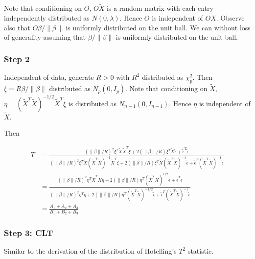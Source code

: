 \documentclass[review]{elsarticle}
\theoremstyle{plain}
\theoremstyle{definition}
\theoremstyle{remark}
\begin{document}
Note that conditioning on $O$, $O\tilde{X}$ is a random matrix with each entry independently distributed as $N(0,\lambda)$. Hence $O$ is independent of $O\tilde{X}$. Observe also that $O\beta/\|\beta\|$ is uniformly distributed on the unit ball.  We can without loss of generality assuming that $\beta/\|\beta\|$ is uniformly distributed on the unit ball.

\subsubsection{Step 2}
Independent of data, generate $R>0$ with $R^2$ distributed as $\chi^2_{p}$. Then $\xi=R\beta/\|\beta\|$ distributed as $N_p(0,I_p)$.
Note that conditioning on $\tilde{X}$, $\eta={(\tilde{X}^T\tilde{X})}^{-1/2}\tilde{X}^T \xi$ is distributed as $N_{n-1}(0,I_{n-1})$. Hence $\eta$ is independent of $\tilde{X}$.

Then

\begin{equation}
    \begin{aligned}
        T&=\frac{{(\|\beta\|/R)}^2\xi^T \tilde{X}\tilde{X}^T \xi+
        2(\|\beta\|/R)\xi^T \tilde{X}\tilde{\epsilon}+
        \tilde{\epsilon}^T\tilde{\epsilon}
    }{{(\|\beta\|/R)}^2\xi^T \tilde{X}{(\tilde{X}^T\tilde{X})}^{-1}\tilde{X}^T \xi+
        2(\|\beta\|/R)\xi^T \tilde{X}{(\tilde{X}^T\tilde{X})}^{-1}\tilde{\epsilon}+
        \tilde{\epsilon}^T{(\tilde{X}^T\tilde{X})}^{-1}\tilde{\epsilon}
    }\\
        &=
        \frac{{(\|\beta\|/R)}^2\eta^T \tilde{X}^T\tilde{X} \eta+
        2(\|\beta\|/R)\eta^T {(\tilde{X}^T\tilde{X})}^{1/2}\tilde{\epsilon}+
        \tilde{\epsilon}^T\tilde{\epsilon}
    }{{(\|\beta\|/R)}^2\eta^T\eta+
        2(\|\beta\|/R)\eta^T{(\tilde{X}^T\tilde{X})}^{-1/2}\tilde{\epsilon}+
        \tilde{\epsilon}^T{(\tilde{X}^T\tilde{X})}^{-1}\tilde{\epsilon}
    }\\
        &=\frac{A_1+A_2+A_3}{B_1+B_2+B_3}
    \end{aligned}
\end{equation}


\subsubsection{Step 3: CLT}
Similar to the derivation of the distribution of Hotelling's $T^2$ statistic.
\end{document}
